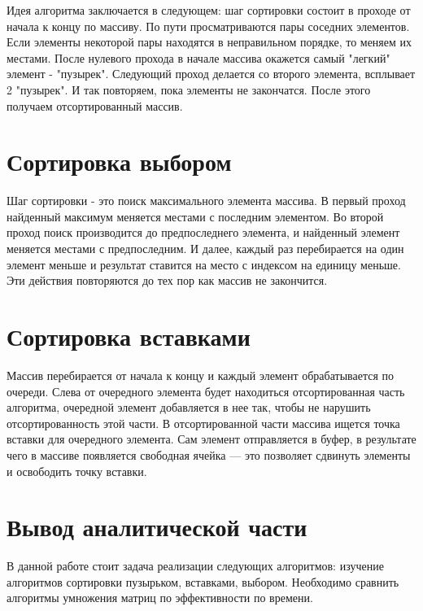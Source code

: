 Идея алгоритма заключается в следующем: шаг сортировки состоит в проходе от начала к концу по массиву. По пути просматриваются пары 
соседних элементов. Если элементы некоторой пары находятся в неправильном порядке, то меняем их местами. После нулевого прохода в начале
массива окажется самый "легкий" элемент - "пузырек". Следующий проход делается со второго элемента, всплывает 2 "пузырек". И так повторяем,
пока элементы не закончатся. После этого получаем отсортированный массив.


\section{Сортировка выбором}\label{ChoiseSort}

Шаг сортировки - это поиск максимального элемента массива.
В первый проход найденный максимум меняется местами с последним элементом. Во второй проход поиск производится до предпоследнего элемента, 
и найденный элемент меняется местами с предпоследним. И далее, каждый раз перебирается на один элемент меньше и результат ставится на место
с индексом на единицу меньше. Эти действия повторяются до тех пор как массив не закончится. 

\section{Сортировка вставками}\label{InsertSort}

Массив перебирается от начала к концу и каждый элемент обрабатывается по очереди. Слева от очередного элемента будет находиться 
отсортированная часть алгоритма, очередной элемент добавляется в нее так, чтобы не нарушить отсортированность этой части. В 
отсортированной части массива ищется точка вставки для очередного элемента. Сам элемент отправляется в буфер, в результате чего в 
массиве появляется свободная ячейка — это позволяет сдвинуть элементы и освободить точку вставки.

\section{Вывод аналитической части}\label{End_analis_chapter}

В данной работе стоит задача реализации следующих алгоритмов: изучение алгоритмов сортировки пузырьком, вставками, выбором.
Необходимо сравнить алгоритмы умножения матриц по эффективности по времени.
 
